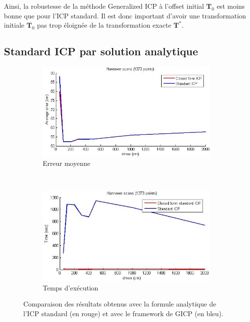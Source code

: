 Ainsi, la robustesse de la méthode Generalized ICP à l'offset initial $\mathbf{T}_0$ est moins bonne que pour l'ICP standard. Il est donc important d'avoir une transformation initiale $\mathbf{T}_0$ pas trop éloignée de la transformation exacte $\mathbf{T}^*$.

\subsection{Standard ICP par solution analytique}



\begin{figure}[!h]
   \centering
   \begin{subfigure}[t]{.5\linewidth}
     \centering
     \includegraphics[scale=0.4]{Images/Resultats/hannover_diff_ICP_closed_form_dmax.jpg}
     \caption{Erreur moyenne}
   \end{subfigure}%
   ~
   \begin{subfigure}[t]{.5\linewidth}
     \centering
     \includegraphics[scale=0.4]{Images/Resultats/hannover_diff_time_ICP_closed_form_dmax.jpg}
     \caption{Temps d'exécution}
   \end{subfigure}
   
   \caption{Comparaison des résultats obtenus avec la formule analytique de l'ICP standard (en rouge) et avec le framework de GICP (en bleu).}
   \label{fig:closedform_ICP}
\end{figure}
